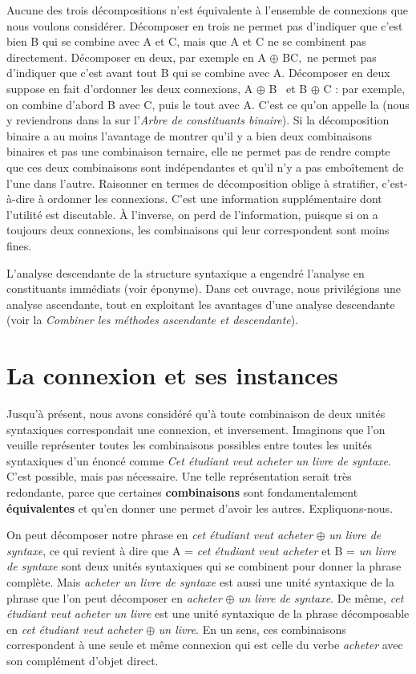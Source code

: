 Aucune des trois décompositions n’est équivalente à l’ensemble de connexions que nous voulons considérer. Décomposer en trois ne permet pas d’indiquer que c’est bien B qui se combine avec A et C, mais que A et C ne se combinent pas directement. Décomposer en deux, par exemple en A ${\oplus}$ BC,~ne permet pas d’indiquer que c’est avant tout B qui se combine avec A. Décomposer en deux suppose en fait d’ordonner les deux connexions, A ${\oplus}$ B~ et B ${\oplus}$ C : par exemple, on combine d’abord B avec C, puis le tout avec A. C’est ce qu’on appelle la  (nous y reviendrons dans la  sur l’\textit{Arbre de constituants binaire}). Si la décomposition binaire a au moins l’avantage de montrer qu’il y a bien deux combinaisons binaires et pas une combinaison ternaire, elle ne permet pas de rendre compte que ces deux combinaisons sont indépendantes et qu’il n’y a pas emboîtement de l’une dans l’autre. Raisonner en termes de décomposition oblige à stratifier, c’est-à-dire à ordonner les connexions. C’est une information supplémentaire dont l’utilité est discutable. À l’inverse, on perd de l’information, puisque si on a toujours deux connexions, les combinaisons qui leur correspondent sont moins fines.

L’analyse descendante de la structure syntaxique a engendré l’analyse en constituants immédiats (voir  éponyme). Dans cet ouvrage, nous privilégions une analyse ascendante, tout en exploitant les avantages d’une analyse descendante (voir la  \textit{Combiner les méthodes ascendante et descendante}).

\section{La connexion et ses instances}\label{sec:3.2.14}

Jusqu’à présent, nous avons considéré qu’à toute combinaison de deux unités syntaxiques correspondait une connexion, et inversement. Imaginons que l’on veuille représenter toutes les combinaisons possibles entre toutes les unités syntaxiques d’un énoncé comme \textit{Cet étudiant veut acheter un livre de syntaxe}. C’est possible, mais pas nécessaire. Une telle représentation serait très redondante, parce que certaines \textbf{combinaisons} sont fondamentalement \textbf{équivalentes} et qu’en donner une permet d’avoir les autres. Expliquons-nous.

On peut décomposer notre phrase en \textit{cet étudiant veut acheter} ${\oplus}$ \textit{un livre de syntaxe}, ce qui revient à dire que A = \textit{cet étudiant veut acheter} et B = \textit{un livre de syntaxe} sont deux unités syntaxiques qui se combinent pour donner la phrase complète. Mais \textit{acheter un livre de syntaxe} est aussi une unité syntaxique de la phrase que l’on peut décomposer en \textit{acheter} ${\oplus}$ \textit{un livre de syntaxe}. De même, \textit{cet étudiant veut acheter un livre} est une unité syntaxique de la phrase décomposable en \textit{cet étudiant veut acheter} ${\oplus}$ \textit{un livre}. En un sens, ces combinaisons correspondent à une seule et même connexion qui est celle du verbe \textit{acheter} avec son complément d’objet direct.

